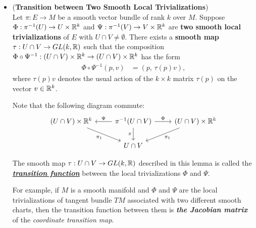 \documentclass[11pt]{article}
\begin{document}
\begin{itemize}
\item \begin{lemma} (\textbf{Transition between Two Smooth Local Trivializations})\\
Let $\pi: E \rightarrow M$ be a smooth vector bundle of rank $k$ over $M$. Suppose $\Phi: \pi^{-1}(U) \rightarrow U \times {\mathbb R}^{k}$ and $\Psi: \pi^{-1}(V) \rightarrow V \times {\mathbb R}^{k}$ are \textbf{two smooth local trivializations} of $E$ with $U \cap V \neq \emptyset$. There exists a \textbf{smooth map} $\tau:  U \cap V \rightarrow GL(k, {\mathbb R})$
such that the composition $\Phi \circ \Psi^{-1}: (U \cap V )\times {\mathbb R}^k \rightarrow (U \cap V) \times {\mathbb R}^k$ has the form
\begin{align*}
\Phi \circ \Psi^{-1}(p,v)  &=  (p,  \, \tau(p)v),
\end{align*} where $\tau(p)v$ denotes the usual action of the $k\times k$ matrix $\tau(p)$ on the vector $v \in {\mathbb R}^k$.
\end{lemma} Note that the following diagram commute:
\[
  \begin{tikzcd}
     (U \cap V )\times \bR^k  \arrow[swap]{dr}{\pi_1} & \arrow[swap]{l}{\Psi}  \pi^{-1}(U \cap V) \arrow{r}{\Phi} \arrow[swap]{d}{\pi} &  (U \cap V )\times \bR^k   \arrow{dl}{\pi_1}\\
    & U \cap V &
  \end{tikzcd}
\] 
\begin{definition}
The smooth map $\tau:  U \cap V \rightarrow GL(k, {\mathbb R})$ described in this lemma is called the \underline{\emph{\textbf{transition function}}} between the local trivializations $\Phi$ and $\Psi$. 

For example, if $M$ is a smooth manifold and $\Phi$ and $\Psi$ are the local trivializations of tangent bundle $TM$ associated with two different smooth charts, then the transition function between them is \emph{\textbf{the Jacobian matrix}} of the \emph{coordinate transition map}.
\end{definition}


\end{itemize}
\end{document}
